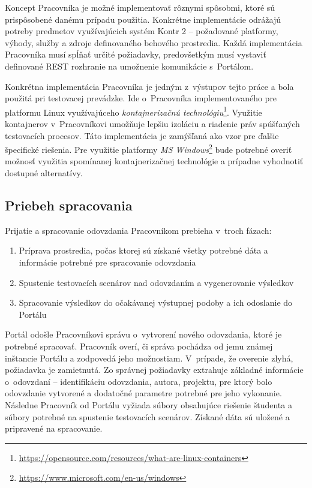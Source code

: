 \documentclass[
  digital, %
  oneside, %
  table,   %
  lof,     %
  lot,   %
]{fithesis3}
\newcommand*{\footurl}[1]{\footnote{\url{#1}}}
\begin{document}
Koncept Pracovníka je možné implementovať rôznymi spôsobmi, ktoré sú prispôsobené danému prípadu použitia. Konkrétne implementácie odrážajú potreby predmetov využívajúcich systém Kontr 2 -- požadované platformy, výhody, služby a zdroje definovaného behového prostredia. Každá implementácia Pracovníka musí spĺňať určité požiadavky, predovšetkým musí vystaviť definované REST rozhranie na umožnenie komunikácie s~Portálom. 

Konkrétna implementácia Pracovníka je jedným z~výstupov tejto práce a bola použitá pri testovacej prevádzke. Ide o~Pracovníka implementovaného pre platformu Linux využívajúceho \emph{kontajnerizačnú technológiu}\footnote{\url{https://opensource.com/resources/what-are-linux-containers}}. Využitie kontajnerov v~Pracovníkovi umožňuje lepšiu izoláciu a riadenie práv spúšťaných testovacích procesov. Táto implementácia je zamýšľaná ako vzor pre ďalšie špecifické riešenia. Pre využitie platformy \emph{MS Windows}\footurl{https://www.microsoft.com/en-us/windows} bude potrebné overiť možnosť využitia spomínanej kontajnerizačnej technológie a prípadne vyhodnotiť dostupné alternatívy.

\subsection{Priebeh spracovania}

Prijatie a spracovanie odovzdania Pracovníkom prebieha v~troch fázach:

\begin{enumerate}
    \item Príprava prostredia, počas ktorej sú získané všetky potrebné dáta a informácie potrebné pre spracovanie odovzdania
    \item Spustenie testovacích scenárov nad odovzdaním a vygenerovanie výsledkov
    \item Spracovanie výsledkov do očakávanej výstupnej podoby a ich odoslanie do Portálu
\end{enumerate}

Portál odošle Pracovníkovi správu o~vytvorení nového odovzdania, ktoré je potrebné spracovať. Pracovník overí, či správa pochádza od jemu známej inštancie Portálu a zodpovedá jeho možnostiam.  V~prípade, že overenie zlyhá, požiadavka je zamietnutá. Zo správnej požiadavky extrahuje základné informácie o~odovzdaní -- identifikáciu odovzdania, autora, projektu, pre ktorý bolo odovzdanie vytvorené a dodatočné parametre potrebné pre jeho vykonanie. Následne Pracovník od Portálu vyžiada súbory obsahujúce riešenie študenta a súbory potrebné na spustenie testovacích scenárov. Získané dáta sú uložené a pripravené na spracovanie. 
\end{document}
